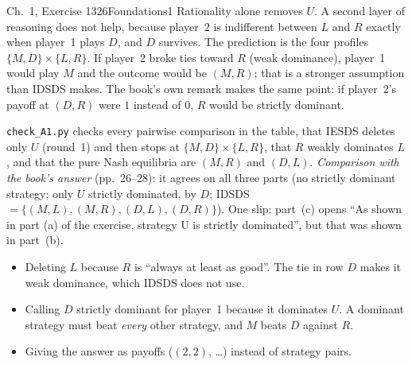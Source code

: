 \begin{exsol}{\MG{} Ch.~1, Exercise 13}{26}{Foundations}{1}
\interp Rationality alone removes $U$. A second layer of reasoning does not help, because
player~2 is indifferent between $L$ and $R$ exactly when player~1 plays $D$, and $D$ survives.
The prediction is the four profiles $\{M,D\}\times\{L,R\}$. If player~2 broke ties toward $R$ (weak
dominance), player~1 would play $M$ and the outcome would be $(M,R)$; that is a stronger assumption
than IDSDS makes. The book's own remark makes the same point: if player~2's payoff at $(D,R)$ were
$1$ instead of $0$, $R$ would be strictly dominant.

\verify \texttt{check\_A1.py} checks every pairwise comparison in the table, that IESDS deletes
only $U$ (round~1) and then stops at $\{M,D\}\times\{L,R\}$, that $R$ weakly dominates $L$, and
that the pure Nash equilibria are $(M,R)$ and $(D,L)$. \emph{Comparison with the book's answer}
(pp.~26--28): it agrees on all three parts (no strictly dominant strategy; only $U$ strictly
dominated, by $D$; IDSDS $= \{(M,L), (M,R), (D,L), (D,R)\}$). One slip: part~(c) opens ``As shown
in part (a) of the exercise, strategy U is strictly dominated'', but that was shown in part~(b).

\mistakes
\begin{itemize}
  \item Deleting $L$ because $R$ is ``always at least as good''. The tie in row $D$ makes it weak
  dominance, which IDSDS does not use.
  \item Calling $D$ strictly dominant for player~1 because it dominates $U$. A dominant strategy
  must beat \emph{every} other strategy, and $M$ beats $D$ against $R$.
  \item Giving the answer as payoffs ($(2,2)$, \dots) instead of strategy pairs.
\end{itemize}

\end{exsol}

